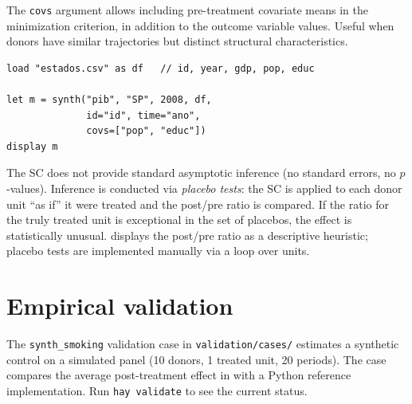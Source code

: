 The \texttt{covs} argument allows including pre-treatment covariate means in
the minimization criterion, in addition to the outcome variable values. Useful
when donors have similar trajectories but distinct structural characteristics.

\begin{lstlisting}[caption={Typical workflow — state policy evaluation}]
load "estados.csv" as df   // id, year, gdp, pop, educ

let m = synth("pib", "SP", 2008, df,
              id="id", time="ano",
              covs=["pop", "educ"])
display m
\end{lstlisting}

\begin{nota}
  The SC does not provide standard asymptotic inference (no standard errors, no
  $p$-values). Inference is conducted via \emph{placebo tests}: the SC is applied
  to each donor unit ``as if'' it were treated and the post/pre ratio is compared.
  If the ratio for the truly treated unit is exceptional in the set of placebos,
  the effect is statistically unusual.
  \hayashi{} displays the post/pre ratio as a descriptive heuristic; placebo tests
  are implemented manually via a loop over units.
\end{nota}

\section{Empirical validation}

The \texttt{synth\_smoking} validation case in \texttt{validation/cases/}
estimates a synthetic control on a simulated panel (10 donors, 1 treated unit,
20 periods). The case compares the average post-treatment effect in \hayashi{}
with a Python reference implementation. Run \lstinline{hay validate} to see the
current status.
